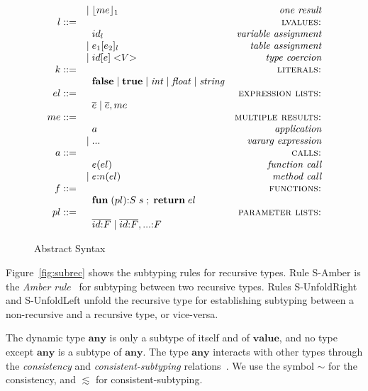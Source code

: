 \documentclass[10pt]{sigplanconf}
\newcommand{\Value}{\mathbf{value}}
\newcommand{\Any}{\mathbf{any}}
\begin{document}
\begin{figure}[t]
{$$\begin{array}{rlr}
	& | \; \lfloor me \rfloor_{1} & \textit{one result}\\
	l ::= & & \textsc{lvalues:}\\
	& \;\; id_{l} & \textit{variable assignment}\\
	& | \; e_{1}[e_{2}]_{l} & \textit{table assignment}\\
	& | \; id[e] \; {<}V{>} & \textit{type coercion}\\
	k ::= & & \textsc{literals:}\\
	& \;\; \mathbf{false} \; | \;
	\mathbf{true} \; | \;
	{\it int} \; | \;
	{\it float} \; | \;
	{\it string} & \\
	el ::= & & \textsc{expression lists:}\\
	& \;\; \overline{e} \; | \;
	\overline{e}, me & \\
	me ::= & & \textsc{multiple results:}\\
	& \;\; a & \textit{application}\\
	& | \; {...} & \textit{vararg expression}\\
	a ::= & & \textsc{calls:}\\
	& \;\; e(el) & \textit{function call}\\
	& | \; e{:}n(el) & \textit{method call}\\
	f ::= & & \textsc{functions:}\\
	& \;\; \mathbf{fun} \; (pl){:}S \; s \;;\; \mathbf{return} \; el & \\
	pl ::= & & \textsc{parameter lists:}\\
	& \;\; \overline{id{:}F} \; | \;
	\overline{id{:}F},{...}{:}F & \\
	\end{array}
	$$
}
	\caption{Abstract Syntax}
	\label{fig:syntax}
\end{figure}

Figure~\ref{fig:subrec} shows the subtyping rules for
recursive types. Rule {\sc S-Amber} is the \emph{Amber rule}~\cite{cardelli1986amber} for subtyping between
two recursive types. Rules {\sc S-UnfoldRight} and {\sc S-UnfoldLeft} unfold the recursive type for establishing
subtyping between a non-recursive and a recursive type,
or vice-versa.

The dynamic type $\Any$ is only a subtype of itself and of
$\Value$, and no type except $\Any$ is a subtype of $\Any$.
The type $\Any$ interacts with other types through the
{\em consistency} and {\em consistent-subtyping} 
relations~\cite{siek2007objects}. We use the symbol $\sim$ for
the consistency, and $\lesssim$ for consistent-subtyping.
\end{document}
